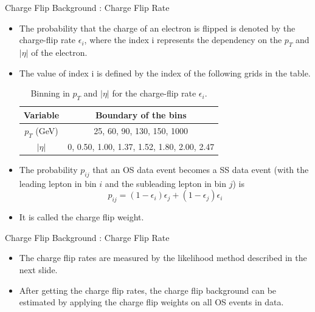 \documentclass[mathserif,serif]{beamer}
\begin{document}
\begin{frame}{Charge Flip Background : Charge Flip Rate}
\begin{itemize}
\item The probability that the charge of an electron is flipped is denoted by the charge-flip rate $\epsilon_i$, where the index i represents the dependency on the $p_T$ and $|\eta|$ of the electron.
\item The value of index i is defined by the index of the following grids in the table.

\begin{table}[htbp]
\centering
\begin{tabular}{|c|c|}
\hline
Variable & Boundary of the bins \\
\hline
$p_T$ (GeV) &  25, 60, 90, 130, 150, 1000 \\
\hline
$|\eta|$ & 0, 0.50, 1.00, 1.37, 1.52, 1.80, 2.00, 2.47 \\
\hline
\end{tabular}
\caption{Binning in $p_T$ and $|\eta|$ for the charge-flip rate $\epsilon_i$.}
\end{table}

\item The probability $p_{ij}$ that an OS data event becomes a SS data event (with the leading lepton in bin $i$ and the subleading lepton in bin $j$) is
\begin{equation*}
p_{ij} = (1 - \epsilon_i)\epsilon_j + (1 - \epsilon_j)\epsilon_i
\end{equation*}
\item It is called the charge flip weight.
\end{itemize}

\end{frame}

\begin{frame}{Charge Flip Background : Charge Flip Rate}
\begin{itemize}
\item The charge flip rates are measured by the likelihood method described in the next slide.
\item After getting the charge flip rates, the charge flip background can be estimated by applying the charge flip weights on all OS events in data.
\end{itemize}
\end{frame}
\end{document}
